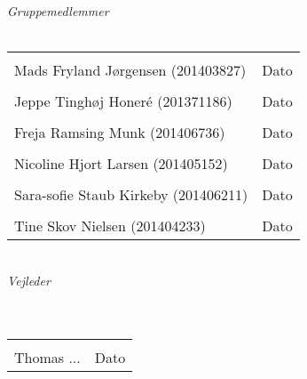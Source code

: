 \begin{vplace}[0.6]
{\large \textit{Gruppemedlemmer}}
\\
\\

\noindent \begin{tabular}{ll}
	\makebox[3.0in]{\hrulefill} & \makebox[1.5in]{\hrulefill}\\
	Mads Fryland Jørgensen (201403827) & Dato\\[7ex]%
	\makebox[3in]{\hrulefill} & \makebox[1.5in]{\hrulefill}\\
	Jeppe Tinghøj Honeré (201371186) & Dato\\[7ex]
	\makebox[3in]{\hrulefill} & \makebox[1.5in]{\hrulefill}\\
	Freja Ramsing Munk (201406736) & Dato\\[7ex]
	\makebox[3in]{\hrulefill} & \makebox[1.5in]{\hrulefill}\\
	Nicoline Hjort Larsen (201405152) & Dato\\[7ex]
	\makebox[3in]{\hrulefill} & \makebox[1.5in]{\hrulefill}\\
	Sara-sofie Staub Kirkeby (201406211) & Dato\\[7ex]
	\makebox[3in]{\hrulefill} & \makebox[1.5in]{\hrulefill}\\
	Tine Skov Nielsen (201404233) & Dato\\[7ex]
	
	
\end{tabular}
\\
{\large \textit{Vejleder}}
\\
\\
\\
\noindent \begin{tabular}{ll}
	\makebox[3.0in]{\hrulefill} & \makebox[1.5in]{\hrulefill}\\
	Thomas ... & Dato\\[8ex]
\end{tabular}
\end{vplace}